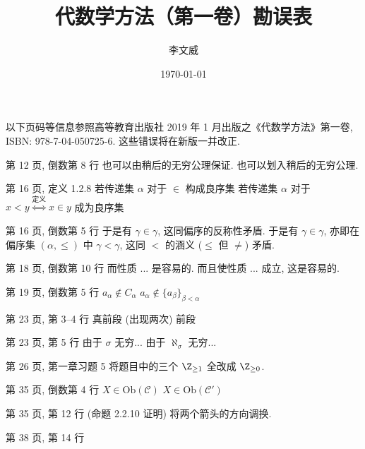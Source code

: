 \documentclass{AJerrata}
\title{\bfseries 代数学方法（第一卷）勘误表}
\author{李文威}
\date{\today}
\begin{document}
	\maketitle
	以下页码等信息参照高等教育出版社 2019 年 1 月出版之《代数学方法》第一卷, ISBN: 978-7-04-050725-6. 这些错误将在新版一并改正.

	\begin{Errata}
		\item[第 12 页, 倒数第 8 行]
		\Orig 也可以由稍后的无穷公理保证.
		\Corr 也可以划入稍后的无穷公理.
		
		\item[第 16 页, 定义 1.2.8]
		\Orig 若传递集 $\alpha$ 对于 $\in$ 构成良序集
		\Corr 若传递集 $\alpha$ 对于 $x < y \stackrel{\text{定义}}{\iff} x \in y$ 成为良序集
		
		\item[第 16 页, 倒数第 5 行]
		\Orig 于是有 $\gamma \in \gamma$, 这同偏序的反称性矛盾.
		\Corr 于是有 $\gamma \in \gamma$, 亦即在偏序集 $(\alpha, \leq)$ 中 $\gamma < \gamma$, 这同 $<$ 的涵义 ($\leq$ 但 $\neq$) 矛盾.
		
		\item[第 18 页, 倒数第 10 行]
		\Orig 而性质 ... 是容易的.
		\Corr 而且使性质 ... 成立, 这是容易的.
		
        \item[第 19 页, 倒数第 5 行]
        \Orig $a_\alpha \notin C_\alpha$
        \Corr $a_\alpha \notin \{ a_\beta \}_{\beta < \alpha}$

		\item[第 23 页, 第 3--4 行]
		\Orig 真前段 (出现两次)
		\Corr 前段

		\item[第 23 页, 第 5 行]
		\Orig 由于 $\sigma$ 无穷...
		\Corr 由于 $\aleph_\sigma$ 无穷...

		\item[第 26 页, 第一章习题 5]
		将题目中的三个 $\Z_{\geq 1}$ 全改成 $\Z_{\geq 0}$.

        \item[第 35 页, 倒数第 4 行]
        \Orig $X \in \mathrm{Ob}(\mathcal{C})$
        \Corr $X \in \mathrm{Ob}(\mathcal{C}')$

        \item[第 35 页, 第 12 行 (命题 2.2.10 证明)]
        将两个箭头的方向调换.

		\item[第 38 页, 第 14 行]
		

\end{Errata}
\end{document}
